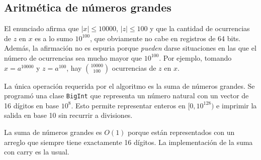\documentclass[10pt,a4paper,notitlepage]{article}
\begin{document}
\subsection{Aritm\'etica de n\'umeros grandes}

El enunciado afirma que $|x| \leq 10000$, $|z| \leq 100$ y que la cantidad de
ocurrencias de $z$ en $x$ es a lo sumo $10^{100}$, que obviamente no cabe en registros
de 64 bits. Adem\'as, la afirmaci\'on no es espuria porque {\em pueden} darse
situaciones en las que el n\'umero de ocurrencias sea mucho mayor que $10^{100}$.
Por ejemplo, tomando $x = a^{10000}$ y $z = a^{100}$, hay
$10000 \choose 100$ ocurrencias de $z$ en $x$.

La \'unica operaci\'on requerida por el algoritmo es la suma de n\'umeros
grandes. Se program\'o una clase \texttt{BigInt} que representa
un n\'umero natural con un vector de 16 d\'igitos en base
$10^8$. Esto permite representar enteros en $[0,10^{128})$
e imprimir la salida en base 10 sin recurrir a divisiones.

La suma de n\'umeros grandes es $O(1)$ porque est\'an representados
con un arreglo que siempre tiene exactamente 16 d\'igitos. La
implementaci\'on de la suma con carry es la usual.
\end{document}

